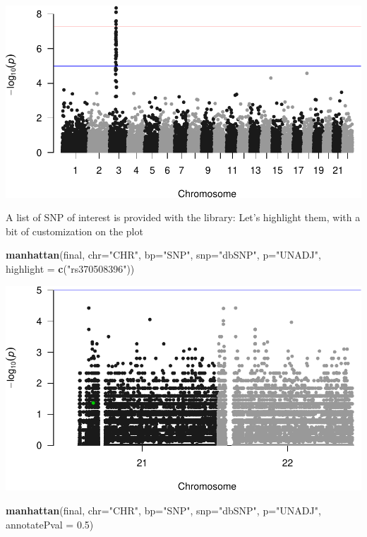 \documentclass[
]{article}
\newenvironment{Shaded}{\begin{snugshade}}{\end{snugshade}}
\newcommand{\DataTypeTok}[1]{\textcolor[rgb]{0.13,0.29,0.53}{#1}}
\newcommand{\FloatTok}[1]{\textcolor[rgb]{0.00,0.00,0.81}{#1}}
\newcommand{\KeywordTok}[1]{\textcolor[rgb]{0.13,0.29,0.53}{\textbf{#1}}}
\newcommand{\NormalTok}[1]{#1}
\newcommand{\StringTok}[1]{\textcolor[rgb]{0.31,0.60,0.02}{#1}}
\begin{document}
\includegraphics{GWASvisualizations_files/figure-latex/unnamed-chunk-9-2.pdf}

A list of SNP of interest is provided with the library: Let's highlight
them, with a bit of customization on the plot

\begin{Shaded}
\begin{Highlighting}[]
\KeywordTok{manhattan}\NormalTok{(final,  }\DataTypeTok{chr=}\StringTok{"CHR"}\NormalTok{, }\DataTypeTok{bp=}\StringTok{"SNP"}\NormalTok{, }\DataTypeTok{snp=}\StringTok{"dbSNP"}\NormalTok{, }\DataTypeTok{p=}\StringTok{"UNADJ"}\NormalTok{, }\DataTypeTok{highlight =} \KeywordTok{c}\NormalTok{(}\StringTok{"rs370508396"}\NormalTok{))}
\end{Highlighting}
\end{Shaded}

\includegraphics{GWASvisualizations_files/figure-latex/unnamed-chunk-10-1.pdf}

\begin{Shaded}
\begin{Highlighting}[]
\KeywordTok{manhattan}\NormalTok{(final,  }\DataTypeTok{chr=}\StringTok{"CHR"}\NormalTok{, }\DataTypeTok{bp=}\StringTok{"SNP"}\NormalTok{, }\DataTypeTok{snp=}\StringTok{"dbSNP"}\NormalTok{, }\DataTypeTok{p=}\StringTok{"UNADJ"}\NormalTok{, }\DataTypeTok{annotatePval =} \FloatTok{0.5}\NormalTok{)}
\end{Highlighting}
\end{Shaded}
\end{document}
